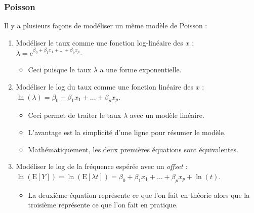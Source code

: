 \documentclass[10pt, french]{article}
\begin{document}
\begin{multicols*}{2}
\subsubsection{Poisson}
Il y a plusieurs façons de modéliser un même modèle de Poisson : 
\begin{enumerate}
	\item	Modéliser le taux comme une fonction log-linéaire des $x$ : $\lambda	=	\textrm{e}^{\beta_{0} + \beta_{1}x_{1} + \dots + \beta_{p}x_{p}}$.
		\begin{itemize}
		\item	Ceci puisque le taux $\lambda$ a une forme exponentielle.
		\end{itemize}
	\item	Modéliser le log du taux comme une fonction linéaire des $x$ : $\ln(\lambda)	=	\beta_{0} + \beta_{1}x_{1} + \dots + \beta_{p}x_{p}$.
		\begin{itemize}
		\item	Ceci permet de traiter le taux $\lambda$ avec un modèle linéaire.
		\item	L'avantage est la simplicité d'une ligne pour résumer le modèle.
		\item	Mathématiquement, les deux premières équations sont équivalentes.
		\end{itemize}
	\item	Modéliser le log de la fréquence espérée avec un \og \textit{offset} \fg{} : $\ln(\text{E}[Y])	=	\ln(\text{E}[\lambda t])	=	\beta_{0} + \beta_{1}x_{1} + \dots + \beta_{p}x_{p}	+	\ln(t)$.
		\begin{itemize}
		\item	La deuxième équation représente ce que l'on fait en théorie alors que la troisième représente ce que l'on fait en pratique.
		\end{itemize}
\end{enumerate}


\end{multicols*}
\end{document}
